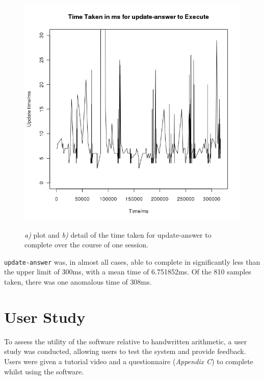 \documentclass[12pt,twoside,notitlepage,xetex]{report}
\begin{document}
{\begin{center}
\begin{figure}[H]
\begin{center}
{\includegraphics[width=\textwidth-2cm]{figs/graphs/update_times_cut30.png}
}
\end{center}
\caption{\emph{a)} plot and \emph{b)} detail of the time taken for {\ttfamily update-answer} to complete over the course of one session.}
\label{fig:UpdateTimes}
\end{figure}
\end{center}

\verb¬update-answer¬ was, in almost all cases, able to complete in significantly less than the upper limit of 300ms, with a mean time of 6.751852ms.  Of the 810 samples taken, there was one anomalous time of 308ms.

%
\section{User Study}

To assess the utility of the software relative to handwritten arithmetic, a user study was conducted, allowing users to test the system and provide feedback.  Users were given a tutorial video and a questionnaire (\emph{Appendix C}) to complete whilst using the software.

}
\end{document}

